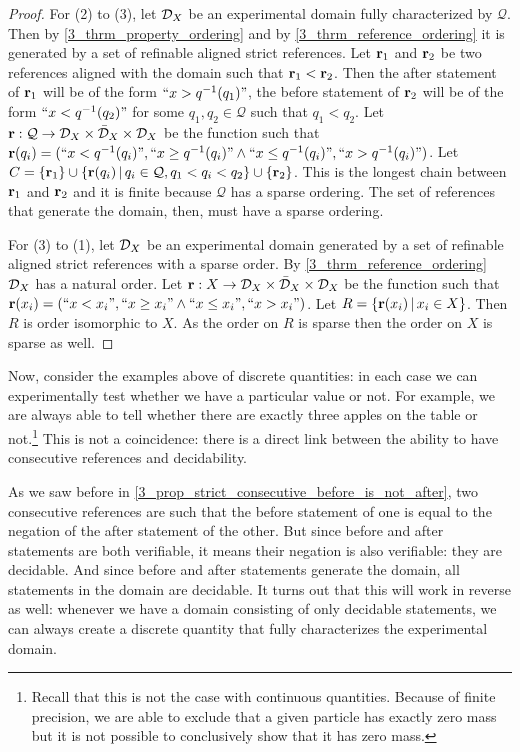 \documentclass[11pt,letterpaper,fleqn]{memoir} %
\begin{document}
\begin{mathSection}
\begin{proof}
	For (2) to (3), let $\mathcal{D}_X$ be an experimental domain fully characterized by $\mathcal{Q}$. Then by \ref{3_thrm_property_ordering} and by \ref{3_thrm_reference_ordering} it is generated by a set of refinable aligned strict references. Let $\textbf{r}_1$ and $\textbf{r}_2$ be two references aligned with the domain such that $\textbf{r}_1 < \textbf{r}_2$. Then the after statement of $\textbf{r}_1$ will be of the form $``x > q^{-1}(q_1)"$, the before statement of $\textbf{r}_2$ will be of the form $``x < q^{-1}(q_2)"$ for some $q_1, q_2 \in \mathcal{Q}$ such that $q_1 < q_2$. Let $\textbf{r} : \mathcal{Q} \to \mathcal{D}_X \times \bar{\mathcal{D}}_X \times \mathcal{D}_X$ be the function such that $\textbf{r}(q_i) = (``x < q^{-1}(q_i)", ``x \geq q^{-1}(q_i)" \wedge ``x \leq q^{-1}(q_i)", ``x > q^{-1}(q_i)")$. Let $C = \{\textbf{r}_1\} \cup \{\textbf{r}(q_i) \, | \, q_i \in \mathcal{Q}, q_1 < q_i < q_2  \} \cup \{ \textbf{r}_2 \}$. This is the longest chain between $\textbf{r}_1$ and $\textbf{r}_2$ and it is finite because $\mathcal{Q}$ has a sparse ordering. The set of references that generate the domain, then, must have a sparse ordering.
	
	For (3) to (1), let $\mathcal{D}_X$ be an experimental domain generated by a set of refinable aligned strict references with a sparse order. By \ref{3_thrm_reference_ordering} $\mathcal{D}_X$ has a natural order. Let $\textbf{r} : X \to \mathcal{D}_X \times \bar{\mathcal{D}}_X \times \mathcal{D}_X$ be the function such that $\textbf{r}(x_i) = (``x < x_i", ``x \geq x_i" \wedge ``x \leq x_i", ``x > x_i")$. Let $R=\{ \textbf{r}(x_i) \, | \, x_i \in X \}$. Then $R$ is order isomorphic to $X$. As the order on $R$ is sparse then the order on $X$ is sparse as well.
\end{proof}
\end{mathSection}

Now, consider the examples above of discrete quantities: in each case we can experimentally test whether we have a particular value or not. For example, we are always able to tell whether there are exactly three apples on the table or not.\footnote{Recall that this is not the case with continuous quantities. Because of finite precision, we are able to exclude that a given particle has exactly zero mass but it is not possible to conclusively show that it has zero mass.} This is not a coincidence: there is a direct link between the ability to have consecutive references and decidability.

As we saw before in \ref{3_prop_strict_consecutive_before_is_not_after}, two consecutive references are such that the before statement of one is equal to the negation of the after statement of the other. But since before and after statements are both verifiable, it means their negation is also verifiable: they are decidable. And since before and after statements generate the domain, all statements in the domain are decidable. It turns out that this will work in reverse as well: whenever we have a domain consisting of only decidable statements, we can always create a discrete quantity that fully characterizes the experimental domain.
\end{document}
